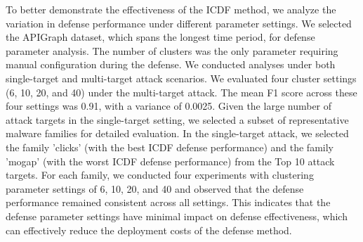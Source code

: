 To better demonstrate the effectiveness of the ICDF method, we analyze the variation in defense performance under different parameter settings.
We selected the APIGraph dataset, which spans the longest time period, for defense parameter analysis.
The number of clusters was the only parameter requiring manual configuration during the defense.
We conducted analyses under both single-target and multi-target attack scenarios.  
We evaluated four cluster settings (6, 10, 20, and 40) under the multi-target attack. 
The mean F1 score across these four settings was 0.91, with a variance of 0.0025.
Given the large number of attack targets in the single-target setting, we selected a subset of representative malware families for detailed evaluation.
In the single-target attack, we selected the family 'clicks' (with the best ICDF defense performance) and the family 'mogap' (with the worst ICDF defense performance) from the Top 10 attack targets.
For each family, we conducted four experiments with clustering parameter settings of 6, 10, 20, and 40 and observed that the defense performance remained consistent across all settings.
This indicates that the defense parameter settings have minimal impact on defense effectiveness, which can effectively reduce the deployment costs of the defense method.